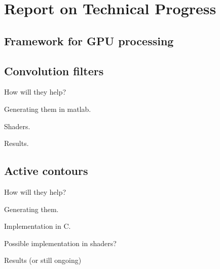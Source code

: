 \section{Report on Technical Progress}

\subsection{Framework for GPU processing}

\subsection{Convolution filters}

How will they help?

Generating them in matlab.

Shaders.

Results.

\subsection{Active contours}

How will they help?

Generating them.

Implementation in C.

Possible implementation in shaders?

Results (or still ongoing)
